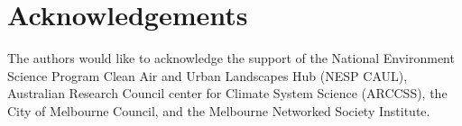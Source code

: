 \documentclass[twocolumn, a4paper]{article}
\begin{document}
\section{Acknowledgements}
The authors would like to acknowledge the support of the National Environment  Science Program Clean Air and Urban Landscapes Hub (NESP CAUL), Australian Research Council center for Climate System Science (ARCCSS), the City of Melbourne Council, and the Melbourne Networked Society Institute. 


\printbibliography %
\end{document}
